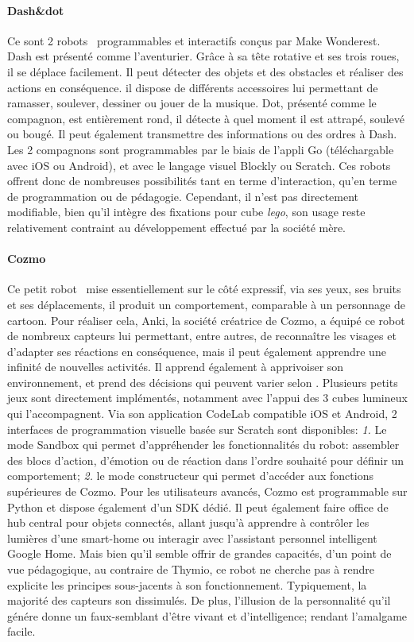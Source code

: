         \paragraph{Dash\&dot}\label{sec:DashDot}
            Ce sont 2 robots~ programmables et interactifs conçus par Make Wonderest. Dash est présenté comme l’aventurier. Grâce à sa tête rotative et ses trois roues, il se déplace facilement. Il peut détecter des objets et des obstacles et réaliser des actions en conséquence. il dispose de différents accessoires lui permettant de ramasser, soulever, dessiner ou jouer de la musique. Dot, présenté comme le compagnon, est entièrement rond, il détecte à quel moment il est attrapé, soulevé ou bougé. Il peut également transmettre des informations ou  des ordres à Dash. Les 2 compagnons sont programmables par le biais de l’appli Go (téléchargable avec iOS ou Android), et avec le langage visuel Blockly ou Scratch. 
            Ces robots offrent donc de nombreuses possibilités tant en terme d'interaction, qu'en terme de programmation ou de pédagogie. Cependant, il n'est pas directement modifiable, bien qu'il intègre des fixations pour cube \textit{lego}, son usage reste relativement contraint au développement effectué par la société mère. 
        \paragraph{Cozmo}\label{sec:Cozmo}\nocite{kusumota2018open} 
            Ce petit robot~ mise essentiellement sur le côté expressif, via ses yeux, ses bruits et ses déplacements, il produit un comportement,   comparable à un personnage de cartoon. Pour réaliser cela, Anki, la société créatrice de Cozmo, a équipé ce robot de nombreux capteurs lui permettant, entre autres, de reconnaître les visages et d'adapter ses réactions en conséquence, mais il peut également apprendre une infinité de nouvelles activités. Il apprend également à apprivoiser son environnement, et prend des décisions qui peuvent varier selon . Plusieurs petits jeux sont directement implémentés, notamment avec l'appui des 3 cubes lumineux qui l'accompagnent.
            Via son application CodeLab compatible iOS et Android, 2 interfaces de programmation visuelle basée sur Scratch sont disponibles:
            \textit{1.} Le mode Sandbox qui permet d'appréhender les fonctionnalités du robot: assembler des blocs d'action, d'émotion ou de réaction dans l'ordre souhaité pour définir un comportement; \textit{2.} le mode constructeur qui permet d'accéder aux fonctions supérieures de Cozmo. Pour les utilisateurs avancés, Cozmo est programmable sur Python et dispose également d'un SDK dédié. Il peut également faire office de hub central pour objets connectés, allant jusqu'à apprendre à contrôler les lumières d'une smart-home ou interagir avec l’assistant personnel intelligent Google Home.
            Mais bien qu'il semble offrir de grandes capacités, d'un point de vue pédagogique, au contraire de Thymio, ce robot ne cherche pas à rendre explicite les principes sous-jacents à son fonctionnement. Typiquement, la majorité des capteurs son dissimulés. De plus, l'illusion de la personnalité qu'il génére  donne un faux-semblant d'être vivant et d'intelligence; rendant l'amalgame facile.
